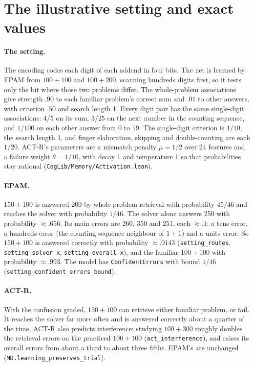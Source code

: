 \documentclass[11pt]{article}
\newcommand{\code}[1]{\texttt{#1}}
\newcommand{\lean}[1]{\texttt{#1}}
\begin{document}
\section{The illustrative setting and exact values}
\label{app:setting}

\paragraph{The setting.} The encoding codes each digit of each addend in four bits. The net is learned by EPAM from $100+100$ and $100+200$, scanning hundreds digits first, so it tests only the bit where those two problems differ. The whole-problem associations give strength $.90$ to each familiar problem's correct sum and $.01$ to other answers, with criterion $.50$ and search length 1. Every digit pair has the same single-digit associations: $4/5$ on its sum, $3/25$ on the next number in the counting sequence, and $1/100$ on each other answer from 0 to 19. The single-digit criterion is $1/10$, the search length 1, and finger elaboration, skipping and double-counting are each $1/20$. ACT-R's parameters are a mismatch penalty $\mu = 1/2$ over 24 features and a failure weight $\theta = 1/10$, with decay 1 and temperature 1 so that probabilities stay rational (\code{CogLib/Memory/Activation.lean}).

\paragraph{EPAM.} $150+100$ is answered 200 by whole-problem retrieval with probability $45/46$ and reaches the solver with probability $1/46$. The solver alone answers 250 with probability $\approx .656$. Its main errors are 260, 350 and 251, each $\approx .1$: a tens error, a hundreds error (the counting-sequence neighbour of $1+1$) and a units error. So $150+100$ is answered correctly with probability $\approx .0143$ (\lean{setting\_routes}, \lean{setting\_solver\_x}, \lean{setting\_overall\_x}), and the familiar $100+100$ with probability $\approx .993$. The model has \lean{ConfidentErrors} with bound $1/46$ (\lean{setting\_confident\_errors\_bound}).

\paragraph{ACT-R.} With the confusion graded, $150+100$ can retrieve either familiar problem, or fail. It reaches the solver far more often and is answered correctly about a quarter of the time. ACT-R also predicts interference: studying $100+300$ roughly doubles the retrieval errors on the practiced $100+100$ (\lean{act\_interference}), and raises its overall errors from about a third to about three fifths. EPAM's are unchanged (\lean{MD.learning\_preserves\_trial}).
\end{document}
